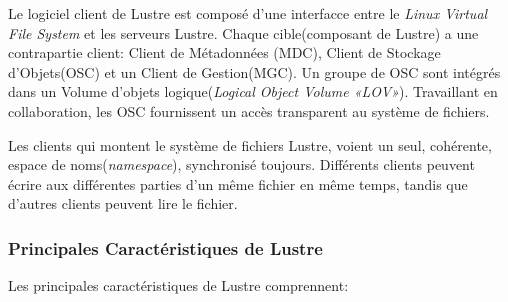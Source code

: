 \documentclass[12pt]{article}
\begin{document}
\begin{description}
Le logiciel client de Lustre est composé d'une interfacce entre le \textit{Linux Virtual File System} et les serveurs Lustre. Chaque cible(composant de Lustre) a une contrapartie client: Client de Métadonnées (MDC), Client de Stockage d'Objets(OSC) et un Client de Gestion(MGC). Un groupe de OSC sont intégrés dans un Volume d'objets logique(\textit{Logical Object Volume «LOV»}). Travaillant en collaboration, les OSC fournissent un accès transparent au système de fichiers.

Les clients qui montent le système de fichiers Lustre, voient un seul, cohérente, espace de noms(\textit{namespace}), synchronisé toujours. Différents clients peuvent écrire aux différentes parties d'un même fichier en même temps, tandis que d'autres clients peuvent lire le fichier.
\end{description}
\subsubsection{Principales Caractéristiques de Lustre}

Les principales caractéristiques de Lustre comprennent: \\
\end{document}
